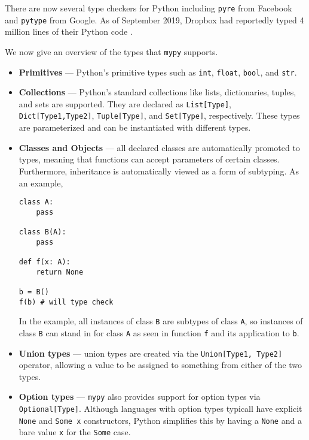 \documentclass{report}
\begin{document}
There are now several type checkers for Python including \texttt{pyre} from Facebook and \texttt{pytype} from Google. As of September 2019, Dropbox had reportedly typed 4 million lines of their Python code \cite{PythonDropbox}.

We now give an overview of the types that \texttt{mypy} supports.
\begin{itemize}
    \item \textbf{Primitives} --- Python's primitive types such as \texttt{int}, \texttt{float}, \texttt{bool}, and \texttt{str}.

    \item \textbf{Collections} --- Python's standard collections like lists, dictionaries, tuples, and sets are supported. They are declared as \texttt{List[Type]}, \texttt{Dict[Type1,Type2]}, \texttt{Tuple[Type]}, and \texttt{Set[Type]}, respectively. These types are parameterized and can be instantiated with different types.

    \item \textbf{Classes and Objects} --- all declared classes are automatically promoted to types, meaning that functions can accept parameters of certain classes. Furthermore, inheritance is automatically viewed as a form of subtyping. As an example,

    \begin{singlespace*}
    \begin{verbatim}
class A:
    pass

class B(A):
    pass

def f(x: A):
    return None

b = B()
f(b) # will type check\end{verbatim}
    \end{singlespace*}
    In the example, all instances of class \texttt{B} are subtypes of class \texttt{A}, so instances of class \texttt{B} can stand in for class \texttt{A} as seen in function \texttt{f} and its application to \texttt{b}.

    \item \textbf{Union types} --- union types are created via the \texttt{Union[Type1, Type2]} operator, allowing a value to be assigned to something from either of the two types.

    \item \textbf{Option types} --- \texttt{mypy} also provides support for option types via \texttt{Optional[Type]}. Although languages with option types typicall have explicit \texttt{None} and \texttt{Some x} constructors, Python simplifies this by having a \texttt{None} and a bare value \texttt{x} for the \texttt{Some} case.


\end{itemize}
\end{document}
